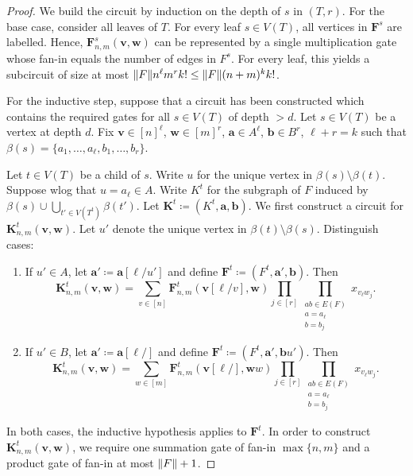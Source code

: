 \documentclass[11pt, DIV=15]{scrarticle}
\theoremstyle{definition}
\theoremstyle{plain}
\theoremstyle{remark}
\DeclarePairedDelimiter{\norm}{\lVert}{\rVert}
\begin{document}
 	\begin{proof}
 		We build the circuit by induction on the depth of $s$ in $(T, r)$.
 		For the base case, consider all leaves of $T$.
 		For every leaf $s \in V(T)$,
 		all vertices in $ \boldsymbol{F}^s$ are labelled.
 		Hence,
 		$ \boldsymbol{F}^s_{n,m}(\boldsymbol{v},\boldsymbol{w})$ can be represented by a single multiplication gate whose fan-in equals the number of edges in $F^s$.
 		For every leaf, this yields a subcircuit of size at most $\norm{F} n^\ell m^r k! \leq \norm{F} (n+m)^k k!$.
 		
 		For the inductive step, suppose that a circuit has been constructed which contains the required gates for all $s \in V(T)$ of depth $> d$.
 		Let $s \in V(T)$ be a vertex at depth $d$.
 		Fix $\boldsymbol{v} \in [n]^\ell$,
 		$\boldsymbol{w} \in [m]^r$, $\boldsymbol{a} \in A^\ell$,
 		$\boldsymbol{b} \in B^r$,
 		$\ell +r = k$ such that
 		$\beta(s) = \{a_1, \dots, a_\ell, b_1, \dots, b_r\}$.
 		
 		Let $t \in V(T)$ be a child of $s$.
 		Write $u$ for the unique vertex in $\beta(s) \setminus \beta(t)$.
 		Suppose wlog that $u = a_\ell \in A$.
 		Write $K^t$ for the subgraph of $F$ induced by $\beta(s) \cup \bigcup_{t' \in V(T^t)} \beta(t')$.
 		Let $\boldsymbol{K}^t \coloneqq (K^t, \boldsymbol{a}, \boldsymbol{b})$.
 		We first construct a circuit for $\boldsymbol{K}^t_{n,m}(\boldsymbol{v}, \boldsymbol{w})$.
 		Let $u'$ denote the unique vertex in $\beta(t) \setminus \beta(s)$.
 		Distinguish cases:
 		\begin{enumerate}
 			\item If $u' \in A$, let $\boldsymbol{a}' \coloneqq \boldsymbol{a}[\ell/u']$ and define $\boldsymbol{F}^t \coloneqq (F^t, \boldsymbol{a}', \boldsymbol{b})$.
 				  Then
 				  \begin{equation}\label{eq:circuit1}
 				  \boldsymbol{K}^t_{n,m}(\boldsymbol{v}, \boldsymbol{w}) = \sum_{v \in [n]} \boldsymbol{F}^t_{n,m}(\boldsymbol{v}[\ell/v], \boldsymbol{w}) \prod_{j \in [r]} \prod_{\substack{a b \in E(F) \\ a = a_\ell \\ b = b_j}} x_{v_\ell w_j}.
 				  \end{equation}
 			\item If $u' \in B$, let $\boldsymbol{a}' \coloneqq \boldsymbol{a}[\ell/]$ and define $\boldsymbol{F}^t \coloneqq (F^t, \boldsymbol{a}', \boldsymbol{b}u')$.
 				  Then
 				  \begin{equation}\label{eq:circuit2}
 				  \boldsymbol{K}^t_{n,m}(\boldsymbol{v}, \boldsymbol{w}) = \sum_{w \in [m]} \boldsymbol{F}^t_{n,m}(\boldsymbol{v}[\ell/], \boldsymbol{w}w) \prod_{j \in [r]} \prod_{\substack{a b \in E(F) \\ a = a_\ell \\ b = b_j}} x_{v_\ell w_j}.
 				  \end{equation}
 		\end{enumerate}
 		In both cases, the inductive hypothesis applies to $\boldsymbol{F}^t$.
 		In order to construct $\boldsymbol{K}^t_{n,m}(\boldsymbol{v}, \boldsymbol{w})$, we require one summation gate of fan-in $\max\{n,m\}$
 		and a product gate of fan-in at most $\norm{F} + 1$.
 		

\end{proof}
\end{document}
